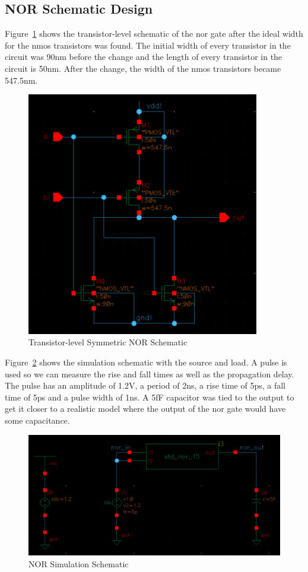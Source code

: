 \documentclass[12pt]{article}
\begin{document}
\subsection{NOR Schematic Design}
Figure~\ref{fig:nor_schem} shows the transistor-level schematic of the nor gate after the ideal width for the nmos transistors was found.
The initial width of every transistor in the circuit was 90nm before the change and the length of every transistor in the circuit is 50nm. After the change, the width of the nmos
transistors became 547.5nm.
\begin{figure}[!htb]
  \centering
  \includegraphics[width=4in]{figures/nor/nor_schem.png}
  \caption{Transistor-level Symmetric NOR Schematic}\label{fig:nor_schem}
\end{figure}
Figure~\ref{fig:nor_sim} shows the simulation schematic with the source and load. A pulse is used so we can measure the rise and fall times as well as the propagation delay. The
pulse has an amplitude of 1.2V, a period of 2ns, a rise time of 5ps, a fall time of 5ps and a pulse width of 1ns. A 5fF capacitor was tied to the output to get it closer to a
realistic model where the output of the nor gate would have some capacitance.
\begin{figure}[!htb]
  \centering
  \includegraphics[width=5in]{figures/nor/nor_sim.png}
  \caption{NOR Simulation Schematic}\label{fig:nor_sim}
\end{figure}
\end{document}
